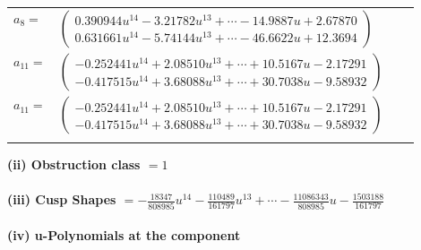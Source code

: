 \documentclass[1p]{elsarticle_modified}
\theoremstyle{definition}
\begin{document}
\begin{tabular}{m{7pt} m{180pt} m{7pt} m{180pt} }
\flushright $a_{8}=$&$\begin{pmatrix}0.390944 u^{14}-3.21782 u^{13}+\cdots-14.9887 u+2.67870\\0.631661 u^{14}-5.74144 u^{13}+\cdots-46.6622 u+12.3694\end{pmatrix}$ \\
\flushright $a_{11}=$&$\begin{pmatrix}-0.252441 u^{14}+2.08510 u^{13}+\cdots+10.5167 u-2.17291\\-0.417515 u^{14}+3.68088 u^{13}+\cdots+30.7038 u-9.58932\end{pmatrix}$\\ \flushright $a_{11}=$&$\begin{pmatrix}-0.252441 u^{14}+2.08510 u^{13}+\cdots+10.5167 u-2.17291\\-0.417515 u^{14}+3.68088 u^{13}+\cdots+30.7038 u-9.58932\end{pmatrix}$\\&\end{tabular}
\flushleft \textbf{(ii) Obstruction class $= 1$}\\~\\
\flushleft \textbf{(iii) Cusp Shapes $= -\frac{18347}{808985} u^{14}-\frac{110489}{161797} u^{13}+\cdots-\frac{11086343}{808985} u-\frac{1503188}{161797}$}\\~\\
\newpage\renewcommand{\arraystretch}{1}
\flushleft \textbf{(iv) u-Polynomials at the component}\newline \\
\end{document}
